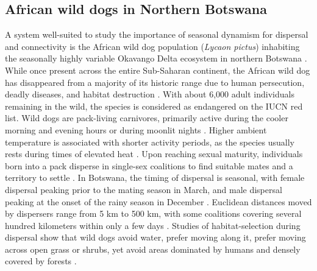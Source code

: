 \documentclass[abstract=on,10pt,a4paper,bibliography=totocnumbered]{article}
\begin{document}
\subsection{African wild dogs in Northern Botswana}

A system well-suited to study the importance of seasonal dynamism for dispersal
and connectivity is the African wild dog population (\textit{Lycaon pictus})
inhabiting the seasonally highly variable Okavango Delta ecosystem in northern
Botswana \citep{McNutt.1996, Wolski.2017}. While once present across the entire
Sub-Saharan continent, the African wild dog has disappeared from a majority of
its historic range due to human persecution, deadly diseases, and habitat
destruction \citep{Woodroffe.2020a}. With about 6,000 adult individuals
remaining in the wild, the species is considered as endangered on the IUCN red
list. Wild dogs are pack-living carnivores, primarily active during the cooler
morning and evening hours \citep{Rasmussen.2012} or during moonlit nights
\citep{Cozzi.2012}. Higher ambient temperature is associated with shorter
activity periods, as the species usually rests during times of elevated heat
\citep{Rabaiotti.2019}. Upon reaching sexual maturity, individuals born into a
pack disperse in single-sex coalitions to find suitable mates and a territory to
settle \citep{McNutt.1996}. In Botswana, the timing of dispersal is seasonal,
with female dispersal peaking prior to the mating season in March, and male
dispersal peaking at the onset of the rainy season in December
\citep{Behr.2020}. Euclidean distances moved by dispersers range from 5 km to
500 km, with some coalitions covering several hundred kilometers within only a
few days \citep{Davies-Mostert.2012, Masenga.2016, Cozzi.2020,
Sandoval-Seres.2022}. Studies of habitat-selection during dispersal show that
wild dogs avoid water, prefer moving along it, prefer moving across open grass
or shrubs, yet avoid areas dominated by humans and densely covered by forests
\citep{ONeill.2020, Hofmann.2021}.
\end{document}
